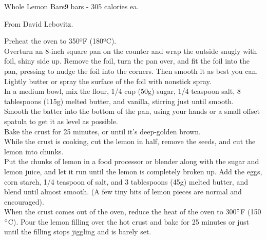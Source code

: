 \begin{recipe}{Whole Lemon Bars}{9 bars - 305 calories ea.}{}

\freeform From David Lebovitz.


Preheat the oven to 350ºF (180ºC).\\

Overturn an 8-inch square pan on the counter and wrap the outside snugly with foil, shiny side up. Remove the foil, turn the pan over, and fit the foil into the pan, pressing to nudge the foil into the corners. Then smooth it as best you can. Lightly butter or spray the surface of the foil with nonstick spray.\\

In a medium bowl, mix the flour, 1/4 cup (50g) sugar, 1/4 teaspoon salt, 8 tablespoons (115g) melted butter, and vanilla, stirring just until smooth.\\

Smooth the batter into the bottom of the pan, using your hands or a small offset spatula to get it as level as possible.\\

Bake the crust for 25 minutes, or until it’s deep-golden brown.\\

While the crust is cooking, cut the lemon in half, remove the seeds, and cut the lemon into chunks.\\

Put the chunks of lemon in a food processor or blender along with the sugar and lemon juice, and let it run until the lemon is completely broken up. Add the eggs, corn starch, 1/4 teaspoon of salt, and 3 tablespoons (45g) melted butter, and blend until almost smooth. (A few tiny bits of lemon pieces are normal and encouraged).\\

When the crust comes out of the oven, reduce the heat of the oven to 300$\degree$F (150$\degree$C). Pour the lemon filling over the hot crust and bake for 25 minutes or just until the filling stops jiggling and is barely set.\newpage


\end{recipe}
